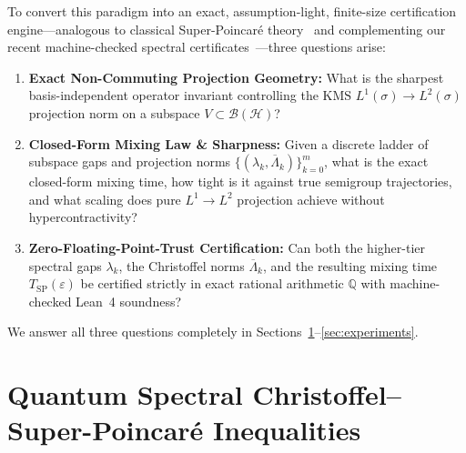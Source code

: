 \documentclass[11pt,a4paper]{article}
\theoremstyle{definition}
\newcommand{\Q}{\mathbb{Q}}
\newcommand{\KMS}{\mathrm{KMS}}
\begin{document}
To convert this paradigm into an exact, assumption-light, finite-size certification engine---analogous to classical Super-Poincar\'e theory~\cite{Wang2000Functional,BakryGentilLedoux2014} and complementing our recent machine-checked spectral certificates~\cite{Antigravity2026Purity,Antigravity2026Continuum}---three questions arise:
\begin{enumerate}[leftmargin=1.6em,itemsep=2pt]
  \item \textbf{Exact Non-Commuting Projection Geometry:} What is the sharpest basis-independent operator invariant controlling the $\KMS$ $L^1(\sigma) \to L^2(\sigma)$ projection norm on a subspace $V \subset \mathcal{B}(\mathcal{H})$?
  \item \textbf{Closed-Form Mixing Law \& Sharpness:} Given a discrete ladder of subspace gaps and projection norms $\{(\lambda_k, \overline{\Lambda}_k)\}_{k=0}^m$, what is the exact closed-form mixing time, how tight is it against true semigroup trajectories, and what scaling does pure $L^1 \to L^2$ projection achieve without hypercontractivity?
  \item \textbf{Zero-Floating-Point-Trust Certification:} Can both the higher-tier spectral gaps $\lambda_k$, the Christoffel norms $\overline{\Lambda}_k$, and the resulting mixing time $T_{\mathrm{SP}}(\varepsilon)$ be certified strictly in exact rational arithmetic $\Q$ with machine-checked Lean~4 soundness?
\end{enumerate}

We answer all three questions completely in Sections~\ref{sec:christoffel}--\ref{sec:experiments}.

\section{Quantum Spectral Christoffel--Super-Poincar\'e Inequalities}
\label{sec:christoffel}
\end{document}
